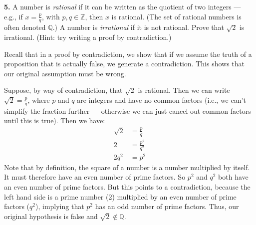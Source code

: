 \documentclass[12pt]{article}
\begin{document}
\bigskip


\textbf{5.} A number is  \emph{rational} if it can be written as the quotient of two integers --- e.g., if $x = \frac{p}{q}$, with $p, q \in \mathbb{Z}$, then $x$ is rational. (The set of rational numbers is often denoted $\mathbb{Q}$.) A number is  \emph{irrational} if it is not rational. Prove that $\sqrt{2}$ is irrational.  (Hint: try writing a proof by contradiction.)

Recall that in a proof by contradiction, we show that if we assume the truth of a proposition that is actually false, we generate a contradiction. This shows that our original assumption must be wrong.

Suppose, by way of contradiction, that $\sqrt{2}$ is rational. Then we can write $\sqrt{2} = \frac{p}{q}$, where $p$ and $q$ are integers and have no common factors (i.e., we can't simplify the fraction further --- otherwise we can just cancel out common factors until this is true). Then we have:
\begin{align}
\sqrt{2} &= \frac{p}{q} \\ 
2 &= \frac{p^2}{q^2} \\ 
2 q^2 &= p^2
\end{align} 
Note that by definition, the square of a number is a number multiplied by itself. It must therefore have an even number of prime factors. So $p^2$ and $q^2$ both have an even number of prime factors. But this points to a contradiction, because the left hand side is a prime number (2) multiplied by an even number of prime factors ($q^2$), implying that $p^2$ has an odd number of prime factors. Thus, our original hypothesis is false and $\sqrt{2} \not\in \mathbb{Q}$. 


%
%


%
\end{document}
